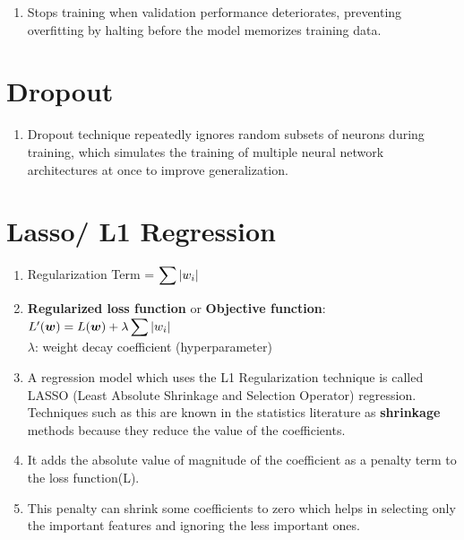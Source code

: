 \begin{enumerate}
    \item Stops training when validation performance deteriorates, preventing overfitting by halting before the model memorizes training data.
    \hfill \cite{wiki/Regularization_mathematics}
\end{enumerate}





\section{Dropout}

\begin{enumerate}
    \item Dropout technique repeatedly ignores random subsets of neurons during training, which simulates the training of multiple neural network architectures at once to improve generalization.
    \hfill \cite{wiki/Regularization_mathematics}
\end{enumerate}





\section{Lasso/ L1 Regression}

\begin{enumerate}
    \item Regularization Term = $ \displaystyle\sum \left| w_i \right|$
    \hfill \cite{geeksforgeeks/machine-learning/regularization-in-machine-learning}

    \item \textbf{Regularized loss function} or \textbf{Objective function}:
    $
        L^\prime (\bm{w}) = L (\bm{w}) + \lambda \displaystyle\sum \left| w_i \right|
    $
    \\
    $\lambda$: weight decay coefficient (hyperparameter)

    \item A regression model which uses the L1 Regularization technique is called LASSO (Least Absolute Shrinkage and Selection Operator) regression.
    Techniques such as this are known in the statistics literature as \textbf{shrinkage} methods because they reduce the value of the coefficients.
    \hfill \cite{geeksforgeeks/machine-learning/regularization-in-machine-learning}

    \item It adds the absolute value of magnitude of the coefficient as a penalty term to the loss function(L).
    \hfill \cite{geeksforgeeks/machine-learning/regularization-in-machine-learning}

    \item This penalty can shrink some coefficients to zero which helps in selecting only the important features and ignoring the less important ones.
    \hfill \cite{geeksforgeeks/machine-learning/regularization-in-machine-learning}
\end{enumerate}




